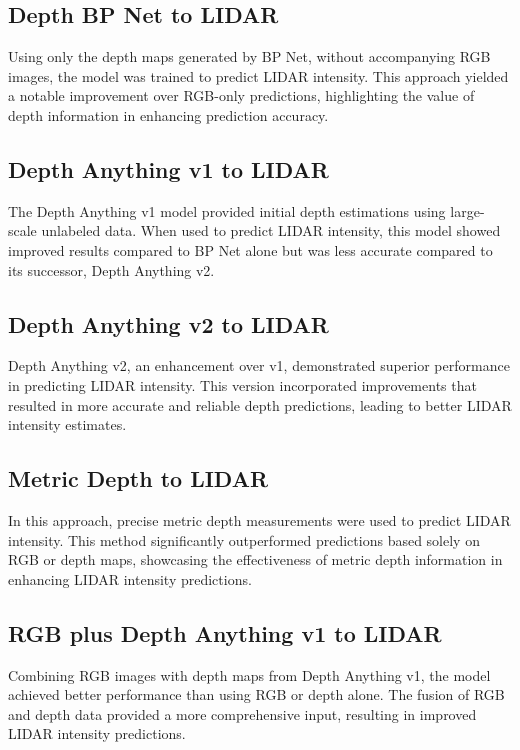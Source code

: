 \subsection{Depth BP Net to LIDAR}

Using only the depth maps generated by BP Net, without accompanying RGB images, the model was trained to predict LIDAR intensity. This approach yielded a notable improvement over RGB-only predictions, highlighting the value of depth information in enhancing prediction accuracy.

\subsection{Depth Anything v1 to LIDAR}

The Depth Anything v1 model provided initial depth estimations using large-scale unlabeled data. When used to predict LIDAR intensity, this model showed improved results compared to BP Net alone but was less accurate compared to its successor, Depth Anything v2.

\subsection{Depth Anything v2 to LIDAR}

Depth Anything v2, an enhancement over v1, demonstrated superior performance in predicting LIDAR intensity. This version incorporated improvements that resulted in more accurate and reliable depth predictions, leading to better LIDAR intensity estimates.

\subsection{Metric Depth to LIDAR}

In this approach, precise metric depth measurements were used to predict LIDAR intensity. This method significantly outperformed predictions based solely on RGB or depth maps, showcasing the effectiveness of metric depth information in enhancing LIDAR intensity predictions.

\subsection{RGB plus Depth Anything v1 to LIDAR}

Combining RGB images with depth maps from Depth Anything v1, the model achieved better performance than using RGB or depth alone. The fusion of RGB and depth data provided a more comprehensive input, resulting in improved LIDAR intensity predictions.

